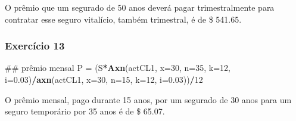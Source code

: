 \documentclass[]{article}
\newenvironment{Shaded}{\begin{snugshade}}{\end{snugshade}}
\newcommand{\DataTypeTok}[1]{\textcolor[rgb]{0.13,0.29,0.53}{#1}}
\newcommand{\DecValTok}[1]{\textcolor[rgb]{0.00,0.00,0.81}{#1}}
\newcommand{\FloatTok}[1]{\textcolor[rgb]{0.00,0.00,0.81}{#1}}
\newcommand{\KeywordTok}[1]{\textcolor[rgb]{0.13,0.29,0.53}{\textbf{#1}}}
\newcommand{\NormalTok}[1]{#1}
\newcommand{\OperatorTok}[1]{\textcolor[rgb]{0.81,0.36,0.00}{\textbf{#1}}}
\newcommand{\StringTok}[1]{\textcolor[rgb]{0.31,0.60,0.02}{#1}}
\begin{document}
O prêmio que um segurado de 50 anos deverá pagar trimestralmente para
contratar esse seguro vitalício, também trimestral, é de \$ 541.65.

\hypertarget{exercicio-13}{%
\subsubsection{Exercício 13}\label{exercicio-13}}

\begin{Shaded}
\begin{Highlighting}[]
\NormalTok{## prêmio mensal}
\NormalTok{P =}\StringTok{ }\NormalTok{(S}\OperatorTok{*}\KeywordTok{Axn}\NormalTok{(actCL1, }\DataTypeTok{x=}\DecValTok{30}\NormalTok{, }\DataTypeTok{n=}\DecValTok{35}\NormalTok{, }\DataTypeTok{k=}\DecValTok{12}\NormalTok{, }\DataTypeTok{i=}\FloatTok{0.03}\NormalTok{)}\OperatorTok{/}\KeywordTok{axn}\NormalTok{(actCL1, }\DataTypeTok{x=}\DecValTok{30}\NormalTok{, }\DataTypeTok{n=}\DecValTok{15}\NormalTok{, }\DataTypeTok{k=}\DecValTok{12}\NormalTok{, }\DataTypeTok{i=}\FloatTok{0.03}\NormalTok{))}\OperatorTok{/}\DecValTok{12}
\end{Highlighting}
\end{Shaded}

O prêmio mensal, pago durante 15 anos, por um segurado de 30 anos para
um seguro temporário por 35 anos é de \$ 65.07.
\end{document}
